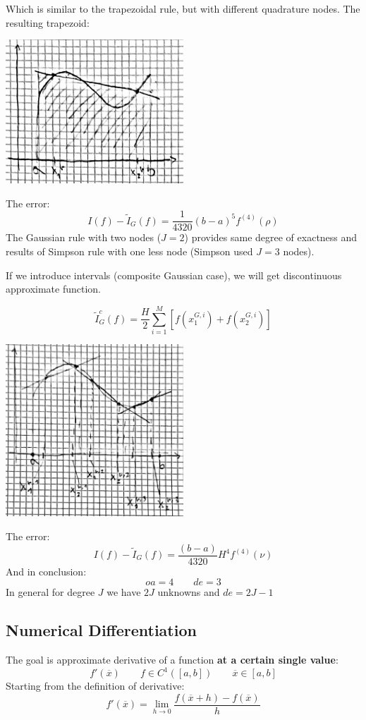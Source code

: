 Which is similar to the trapezoidal rule, but with different quadrature nodes. The resulting trapezoid:
\begin{center}
    \includegraphics[width=0.5\textwidth]{images/gaussian_quad1.png}
\end{center}
The error:
$$
I(f)-\tilde{I}_G(f)=\frac{1}{4320}(b-a)^5f^{(4)}(\rho)
$$
The Gaussian rule with two nodes ($J=2$) provides same degree of exactness and results of Simpson rule with one less node (Simpson used $J=3$ nodes).

If we introduce intervals (composite Gaussian case), we will get discontinuous approximate function.

\begin{LARGE}
    $$
    \tilde{I}_G^c(f)=\frac{H}{2}
    \sum_{i=1}^M
    \left[
        f(x_1^{G,i})+
        f(x_2^{G,i})
    \right]
    $$
\end{LARGE}
\begin{center}
    \includegraphics[width=0.5\textwidth]{images/gaussian_quad2.png}
\end{center}
The error:
$$
I(f)-\tilde{I}_G(f)=\frac{(b-a)}{4320}H^4f^{(4)}(\nu)
$$
And in conclusion:
$$
oa=4\qquad de=3
$$
In general for degree $J$ we have $2J$ unknowns and $de=2J-1$

\subsection{Numerical Differentiation}
The goal is approximate derivative of a function \textbf{at a certain single value}:
$$
f'(\overline{x})\qquad f\in C^1\left([a,b]\right)\qquad\overline{x}\in [a,b]
$$
Starting from the definition of derivative:
$$
f'(\overline{x})=\lim_{h\rightarrow 0}
\frac{
    f(\overline{x}+h)-f(\overline{x})
}{h}
$$
